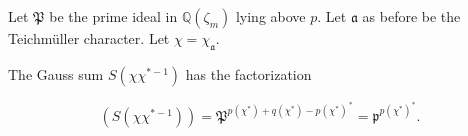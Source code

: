 Let $\mathfrak{P}$ be the prime ideal in $\mathbb{Q}(\zeta_m)$ lying above $p$. Let $\mathfrak{a}$ as before be the Teichmüller character. Let $\chi = \chi_{\mathfrak{a}}$.

The Gauss sum $S(\chi\chi^{*-1})$ has the factorization

$$(S(\chi\chi^{*-1})) = \mathfrak{P}^{p(\chi^*) + q(\chi^*) - p(\chi^*)^{\,*}} = \mathfrak{p}^{p(\chi^*)^*}.$$
